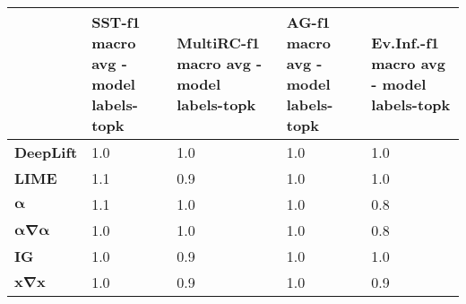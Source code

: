 \begin{tabular}{lllll}
\toprule
{} & SST-f1 macro avg - model labels-topk & MultiRC-f1 macro avg - model labels-topk & AG-f1 macro avg - model labels-topk & Ev.Inf.-f1 macro avg - model labels-topk \\
\midrule
\textbf{DeepLift}                         &                                  1.0 &                                      1.0 &                                 1.0 &                                      1.0 \\
\textbf{LIME}                             &                                  1.1 &                                      0.9 &                                 1.0 &                                      1.0 \\
$\boldsymbol{\alpha}$                     &                                  1.1 &                                      1.0 &                                 1.0 &                                      0.8 \\
$\boldsymbol{\alpha\nabla\alpha}$         &                                  1.0 &                                      1.0 &                                 1.0 &                                      0.8 \\
\textbf{IG}                               &                                  1.0 &                                      0.9 &                                 1.0 &                                      1.0 \\
$\boldsymbol{\mathbf{x}\nabla\mathbf{x}}$ &                                  1.0 &                                      0.9 &                                 1.0 &                                      0.9 \\
\bottomrule
\end{tabular}
